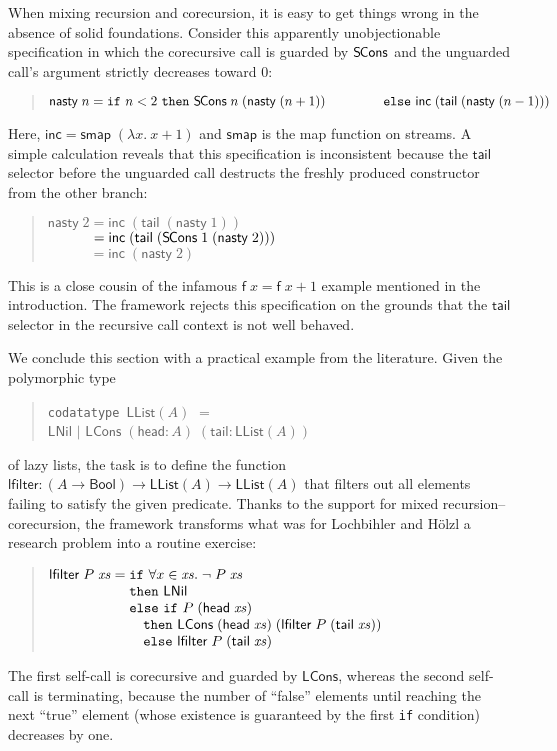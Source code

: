 \documentclass[preprint,draft]
{sigplanconf}
\newcommand\TC{\mathsf}
\newcommand\keyw[1]{\texttt{#1}}
\newcommand{\ra}{\rightarrow}
\newcommand{\<}{\langle}
\renewcommand{\>}{\rangle}
\newcommand{\inc}{{{\mathsf{inc}}}}
\newcommand{\evil}{{{\mathsf{nasty}}}}
\newcommand{\mapS}{{{\mathsf{smap}}}}
\newcommand{\hd}{{{\mathsf{head}}}}
\newcommand{\tl}{{{\mathsf{tail}}}}
\newcommand{\SCons}{{{\mathsf{S\hspace*{-0.2ex}Cons}}}}
\newcommand{\Bool}{{\TC{Bool}}}
\newcommand\const[1]{{\ensuremath{\TC{#1}}}}
\begin{document}
When mixing recursion and corecursion, it is easy to
get things wrong in the absence of solid foundations.
Consider this apparently unobjectionable specification in which the
corecursive call is guarded by $\SCons$ and the unguarded call's argument
strictly decreases toward 0:
\begin{quote}
$\evil\;n  =  \keyw{if}~n < 2~\keyw{then}~\SCons\;n\;(\evil\;(n+1))\\
\phantom{\evil\;n  =  {}} \keyw{else}~\inc\;(\tl\;(\evil\;(n-1)))$
\end{quote}
Here, $\inc = \mapS\;(\lambda x.~x + 1)$ and $\mapS$ is the map function on
streams. A simple calculation reveals
that this specification is inconsistent
because the $\tl$ selector before the unguarded
call destructs the freshly produced constructor from the other branch:
\begin{quote}
$\evil\;2{} = {}\inc\;(\tl\;(\evil\;1))$ \\$\phantom{\evil\;2}{} = \inc\;(\tl\;(\SCons\;1\;(\evil\;2)))$\kern-200mm \\$\phantom{\evil\;2}{} = {}\inc\;(\evil\;2)$
\end{quote}
This is a close cousin of the infamous $\const{f}\;x = \const{f}\;x + 1$ example
mentioned in the introduction.
The framework rejects this specification on the grounds that the $\tl$ selector in the
recursive call context is not well behaved.

We conclude this section with a practical example from the literature.
Given the polymorphic type
\begin{quote}
  \keyw{codatatype} \,$\TC{LList}(A)$ $=$ \\
  \noindent\hbox{}\quad $\const{LNil}$ $\mid$ $\const{LCons}\;(\hd: A)\;(\tl: \TC{LList}(A))$
\end{quote}
of lazy lists, the task is to define the function
$\const{lfilter} : (A \ra \Bool) \ra \TC{LList}(A) \ra \TC{LList}(A)$
that filters out all elements failing to satisfy the given predicate.
Thanks to the support for mixed recursion--corecursion, the framework
transforms what was for Lochbihler and H\"olzl \cite{lochbihler-hoelzl-2014} a
research problem into a routine exercise:
\begin{quote}
$\const{lfilter}\;P\;\mathit{xs} =
      \!\begin{aligned}[t]
& \keyw{if}~ \forall x \in \mathit{xs}.\; \lnot\; P\; \mathit{xs} \\[-\jot]
&         \keyw{then}~\const{LNil} \\[-\jot]
&       \keyw{else}~\keyw{if}~ P\; (\hd\;\mathit{xs}) \\[-\jot]
&\quad         \keyw{then}~\const{LCons}\; (\hd\; \mathit{xs})\; (\const{lfilter}\; P\; (\tl\; \mathit{xs})) \\[-\jot]
&\quad       \keyw{else}~\const{lfilter}\; P\; (\tl\; \mathit{xs})\end{aligned}$
\end{quote}
The first self-call is corecursive and guarded by \const{LCons}, whereas the second
self-call is terminating, because the number of ``false'' elements
until reaching the next ``true'' element (whose existence is guaranteed by the
first \keyw{if} condition) decreases by one.
\end{document}
